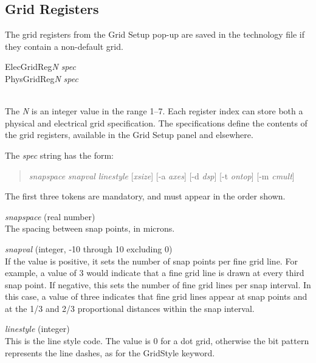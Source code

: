 \subsection{Grid Registers}

The grid registers from the {\cb Grid Setup} pop-up are saved in
the technology file if they contain a non-default grid.

\begin{description}
\item\parbox[b]{4in}{{\vt ElecGridReg}{\it N} {\it spec}\\
 {\vt PhysGridReg}{\it N} {\it spec}}\\
The {\it N} is an integer value in the range 1--7.  Each register
index can store both a physical and electrical grid specification. 
The specifications define the contents of the grid registers,
available in the {\cb Grid Setup} panel and elsewhere.

The {\it spec} string has the form:
\begin{quote}
{\it snapspace} {\it snapval} {\it linestyle} [{\it xsize\/}]
[{\vt -a} {\it axes\/}] [{\vt -d} {\it dsp\/}]
[{\vt -t} {\it ontop\/}] [{\vt -m} {\it cmult\/}]
\end{quote}

The first three tokens are mandatory, and must appear in the order
shown.

\begin{description}
\item{\it snapspace} (real number)\\
The spacing between snap points, in microns.

\item{\it snapval} (integer, -10 through 10 excluding 0)\\
If the value is positive, it sets the number of snap points per fine
grid line.  For example, a value of 3 would indicate that a fine grid
line is drawn at every third snap point.  If negative, this sets the
number of fine grid lines per snap interval.  In this case, a value of
three indicates that fine grid lines appear at snap points and at the
1/3 and 2/3 proportional distances within the snap interval.

\item{\it linestyle} (integer)\\
This is the line style code.  The value is 0 for a dot grid, otherwise
the bit pattern represents the line dashes, as for the {\vt GridStyle}
keyword.
\end{description}


\end{description}
